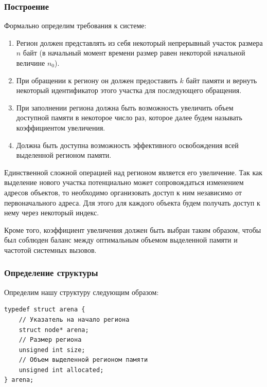\documentclass[bachelor, och, coursework]{SCWorks}
\begin{document}
\subsubsection{Построение}

Формально определим требования к системе:

\begin{enumerate}
    \item Регион должен представлять из себя некоторый 
    непрерывный участок размера $n$ байт (в начальный 
    момент времени размер равен некоторой начальной величине 
    $n_0$).
    \item При обращении к региону он должен предоставить $k$ 
    байт памяти и вернуть некоторый идентификатор этого 
    участка для последующего обращения.
    \item При заполнении региона должна быть возможность 
    увеличить объем доступной памяти в некоторое число раз, 
    которое далее будем называть коэффициентом увеличения.
    \item Должна быть доступна возможность эффективного 
    освобождения всей выделенной регионом памяти.
\end{enumerate}

Единственной сложной операцией над регионом является его 
увеличение. Так как выделение нового участка потенциально 
может сопровождаться изменением адресов объектов, то 
необходимо организовать доступ к ним независимо от первоначального 
адреса. Для этого для каждого объекта будем получать
доступ к нему через некоторый индекс.

Кроме того, коэффициент увеличения должен быть выбран таким 
образом, чтобы был соблюден баланс между оптимальным объемом 
выделенной памяти и частотой системных вызовов.


\subsubsection{Определение структуры}


Определим нашу структуру следующим образом:

\begin{verbatim}
typedef struct arena {
	// Указатель на начало региона
	struct node* arena;
	// Размер региона
	unsigned int size;
	// Объем выделенной регионом памяти
	unsigned int allocated;
} arena;
\end{verbatim}
\end{document}
